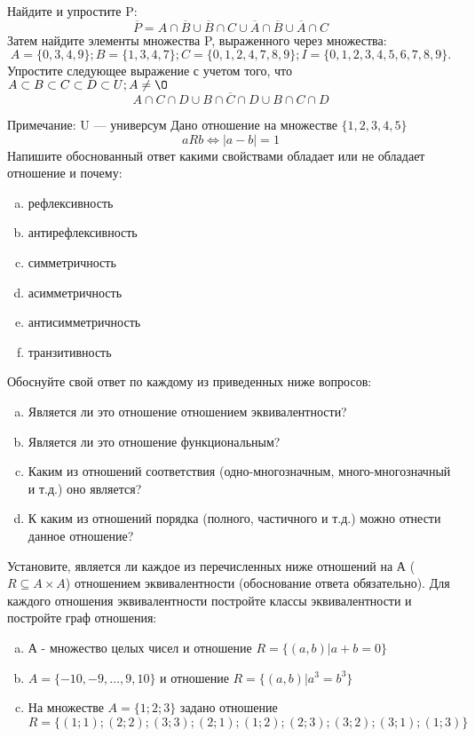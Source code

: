 \documentclass[10pt]{exam}
\begin{document}
\begin{questions}
\question
Найдите и упростите P:
\begin{equation*}
\overline{P} = A \cap \overline{B} \cup \overline{B} \cap C \cup \overline{A} \cap \overline{B} \cup \overline{A} \cap C
\end{equation*}
Затем найдите элементы множества P, выраженного через множества:
\begin{equation*}
A = \{0, 3, 4, 9\}; 
B = \{1, 3, 4, 7\};
C = \{0, 1, 2, 4, 7, 8, 9\};
I = \{0, 1, 2, 3, 4, 5, 6, 7, 8, 9\}.
\end{equation*}\question
Упростите следующее выражение с учетом того, что $A\subset B \subset C \subset D \subset U; A \neq \O$
\begin{equation*}
A \cap C  \cap D \cup B \cap \overline{C} \cap D \cup B \cap C \cap D
\end{equation*}

Примечание: U — универсум\question
Дано отношение на множестве $\{1, 2, 3, 4, 5\}$ 
\begin{equation*}
aRb \iff |a-b| = 1
\end{equation*}
Напишите обоснованный ответ какими свойствами обладает или не обладает отношение и почему:   
\begin{enumerate} [a)]\setcounter{enumi}{0}
\item рефлексивность
\item антирефлексивность
\item симметричность
\item асимметричность
\item антисимметричность
\item транзитивность
\end{enumerate}

Обоснуйте свой ответ по каждому из приведенных ниже вопросов:
\begin{enumerate} [a)]\setcounter{enumi}{0}
    \item Является ли это отношение отношением эквивалентности?
    \item Является ли это отношение функциональным?
    \item Каким из отношений соответствия (одно-многозначным, много-многозначный и т.д.) оно является?
    \item К каким из отношений порядка (полного, частичного и т.д.) можно отнести данное отношение?
\end{enumerate}

\question
Установите, является ли каждое из перечисленных ниже отношений на А ($R \subseteq A \times A$) отношением эквивалентности (обоснование ответа обязательно). Для каждого отношения эквивалентности 
постройте классы эквивалентности и постройте граф отношения:
\begin{enumerate}[a)]\setcounter{enumi}{0}
\item А - множество целых чисел и отношение $R = \{(a,b)|a + b = 0\}$
\item $A = \{-10, -9, …, 9, 10\}$ и отношение $R = \{(a,b)|a^{3} = b^{3}\}$
\item На множестве $A = \{1; 2; 3\}$ задано отношение $R = \{(1; 1); (2; 2); (3; 3); (2; 1); (1; 2); (2; 3); (3; 2); (3; 1); (1; 3)\}$


\end{enumerate}
\end{questions}
\end{document}
